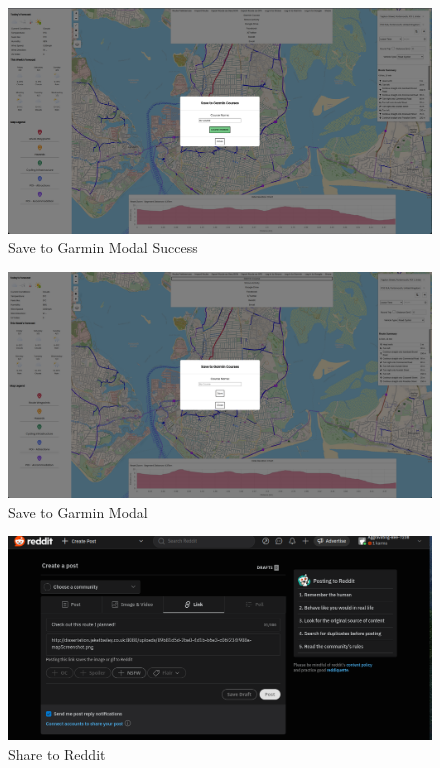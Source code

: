 \begin{figure}[!ht]
    \centering
    \includegraphics[width=425px]{figures/Progress Images/Iteration-3/SR50/SR50 - Save to Garmin Modal Success.png}
    \caption{Save to Garmin Modal Success}
    \label{fig:-garmin-modal-success}
\end{figure}

\begin{figure}[!ht]
    \centering
    \includegraphics[width=425px]{figures/Progress Images/Iteration-3/SR50/SR50 - Save to Garmin Modal.png}
    \caption{Save to Garmin Modal}
    \label{fig:-garmin-modal}
\end{figure}

\begin{figure}[!ht]
    \centering
    \includegraphics[width=425px]{figures/Progress Images/Iteration-3/SR51/SR51-Share to Reddit.png}
    \caption{Share to Reddit}
    \label{fig:share-reddit}
\end{figure}

